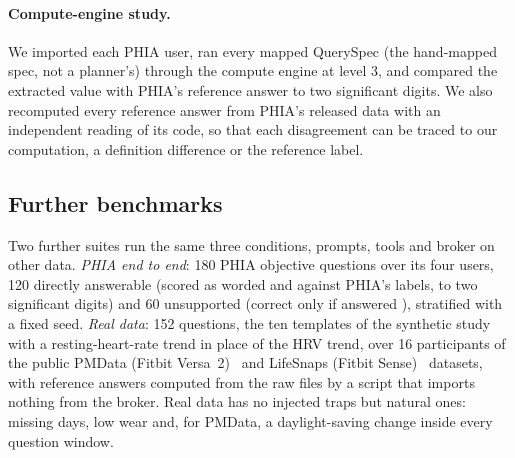 \paragraph{Compute-engine study.} We imported each PHIA user, ran every mapped QuerySpec (the hand-mapped spec, not a
planner's) through the compute engine at level 3, and compared the extracted value with PHIA's reference answer to two
significant digits. We also recomputed every reference answer from PHIA's released data with an independent reading
of its code, so that each disagreement can be traced to our computation, a definition difference or the reference
label.

\subsection{Further benchmarks}\label{sec:bench-design}

Two further suites run the same three conditions, prompts, tools and broker on other data. \emph{PHIA end to end}: 180 PHIA objective questions over its four users, 120
directly answerable (scored as worded and against PHIA's labels, to two significant digits) and 60 unsupported (correct only if
answered ), stratified with a fixed seed. \emph{Real data}: 152 questions, the ten templates of the
synthetic study with a resting-heart-rate trend in place of the HRV trend, over 16 participants of the public PMData
(Fitbit Versa~2)~\citep{thambawita2020pmdata} and LifeSnaps (Fitbit Sense)~\citep{yfantidou2022lifesnaps} datasets, with reference answers computed from the raw files by a
script that imports nothing from the broker. Real data has no injected traps but natural ones: missing days, low wear
and, for PMData, a daylight-saving change inside every question window.
